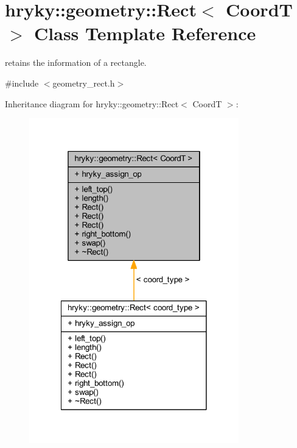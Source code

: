 \hypertarget{classhryky_1_1geometry_1_1_rect}{\section{hryky\-:\-:geometry\-:\-:Rect$<$ Coord\-T $>$ Class Template Reference}
\label{classhryky_1_1geometry_1_1_rect}
}


retains the information of a rectangle.  




{\ttfamily \#include $<$geometry\-\_\-rect.\-h$>$}



Inheritance diagram for hryky\-:\-:geometry\-:\-:Rect$<$ Coord\-T $>$\-:
\nopagebreak
\begin{figure}[H]
\begin{center}
\leavevmode
\includegraphics[width=258pt]{classhryky_1_1geometry_1_1_rect__inherit__graph}
\end{center}
\end{figure}
